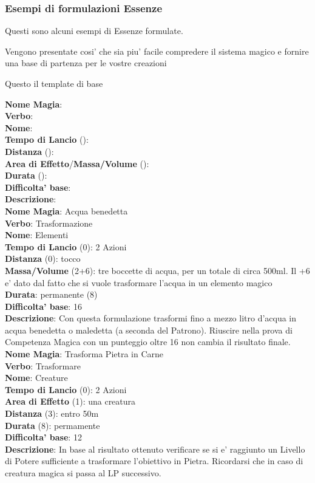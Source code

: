 \subsubsection{Esempi di formulazioni Essenze}

Questi sono alcuni esempi di Essenze formulate.

Vengono presentate cosi' che sia piu' facile compredere il sistema magico e fornire una base di partenza per le vostre creazioni


Questo il template di base


\flushleft \textbf{Nome Magia}: \\ 
\textbf{Verbo}: \\
\textbf{Nome}: \\
\textbf{Tempo di Lancio} (): \\
\textbf{Distanza} (): \\
\textbf{Area di Effetto}/\textbf{Massa/Volume} (): \\
\textbf{Durata} (): \\
\textbf{Difficolta' base}: \\
\textbf{Descrizione}: \\


\flushleft \textbf{Nome Magia}: Acqua benedetta\\  
\textbf{Verbo}: Trasformazione\\
\textbf{Nome}: Elementi\\
\textbf{Tempo di Lancio} (0): 2 Azioni\\
\textbf{Distanza} (0): tocco\\
\textbf{Massa/Volume} (2+6): tre boccette di acqua, per un totale di circa 500ml. Il +6 e' dato dal fatto che si vuole trasformare l'acqua in un elemento magico\\
\textbf{Durata}: permanente (8)\\
\textbf{Difficolta' base}: 16\\
\textbf{Descrizione}: Con questa formulazione trasformi fino a mezzo litro d'acqua in acqua benedetta o maledetta (a seconda del Patrono). Riuscire nella prova di Competenza Magica con un punteggio oltre 16 non cambia il risultato finale.\\


\flushleft \textbf{Nome Magia}: Trasforma Pietra in Carne \\ 
\textbf{Verbo}: Trasformare\\
\textbf{Nome}: Creature\\
\textbf{Tempo di Lancio} (0): 2 Azioni\\
\textbf{Area di Effetto} (1): una creatura\\
\textbf{Distanza} (3): entro 50m\\
\textbf{Durata} (8): permamente\\
\textbf{Difficolta' base}: 12 \\
\textbf{Descrizione}: In base al risultato ottenuto verificare se si e' raggiunto un Livello di Potere sufficiente a trasformare l'obiettivo in Pietra.
Ricordarsi che in caso di creatura magica si passa al LP successivo.\\


